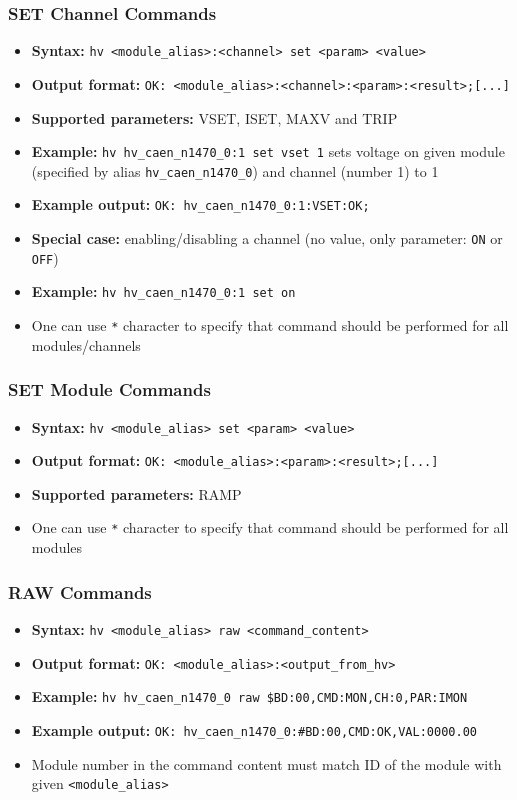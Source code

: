 \dotfill

\subsubsection*{SET Channel Commands}
\begin{itemize}
\item \textbf{Syntax:} \lstinline{hv <module_alias>:<channel> set <param> <value>}
\item \textbf{Output format:} \lstinline{OK: <module_alias>:<channel>:<param>:<result>;[...]}
\item \textbf{Supported parameters:} VSET, ISET, MAXV and TRIP
\item \textbf{Example:} \lstinline{hv hv_caen_n1470_0:1 set vset 1} sets voltage on given module (specified by alias \lstinline{hv_caen_n1470_0}) and channel (number 1) to 1
\item \textbf{Example output:} \lstinline{OK: hv_caen_n1470_0:1:VSET:OK;}
\item \textbf{Special case:} enabling/disabling a channel (no value, only parameter: \lstinline{ON} or \lstinline{OFF})
\item \textbf{Example:} \lstinline{hv hv_caen_n1470_0:1 set on}
\item One can use \lstinline{*} character to specify that command should be performed for all modules/channels
\end{itemize}

\dotfill

\subsubsection*{SET Module Commands}
\begin{itemize}
\item \textbf{Syntax:} \lstinline{hv <module_alias> set <param> <value>}
\item \textbf{Output format:} \lstinline{OK: <module_alias>:<param>:<result>;[...]}
\item \textbf{Supported parameters:} RAMP
\item One can use \lstinline{*} character to specify that command should be performed for all modules
\end{itemize}

\dotfill

\subsubsection*{RAW Commands}
\begin{itemize}
\item \textbf{Syntax:} \lstinline{hv <module_alias> raw <command_content>}
\item \textbf{Output format:} \lstinline{OK: <module_alias>:<output_from_hv>}
\item \textbf{Example:} \lstinline{hv hv_caen_n1470_0 raw $BD:00,CMD:MON,CH:0,PAR:IMON}
\item \textbf{Example output:} \lstinline{OK: hv_caen_n1470_0:#BD:00,CMD:OK,VAL:0000.00}
\item Module number in the command content must match ID of the module with given \lstinline{<module_alias>}
\end{itemize}